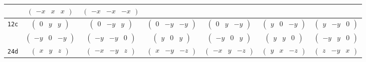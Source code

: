 \documentclass[fleqn,9pt,landscape]{jsarticle}
\begin{document}
\begin{center}
\begin{longtable}{ccccccc}
& $ \begin{pmatrix} - x & x & x \end{pmatrix} $ & $ \begin{pmatrix} - x & - x & - x \end{pmatrix} $ & $  $ & $  $ & $  $ & $  $ \\ \hline
{\tt 12c} & $ \begin{pmatrix} 0 & y & y \end{pmatrix} $ & $ \begin{pmatrix} 0 & - y & y \end{pmatrix} $ & $ \begin{pmatrix} 0 & - y & - y \end{pmatrix} $ & $ \begin{pmatrix} 0 & y & - y \end{pmatrix} $ & $ \begin{pmatrix} y & 0 & - y \end{pmatrix} $ & $ \begin{pmatrix} y & - y & 0 \end{pmatrix} $ \\
& $ \begin{pmatrix} - y & 0 & - y \end{pmatrix} $ & $ \begin{pmatrix} - y & - y & 0 \end{pmatrix} $ & $ \begin{pmatrix} y & 0 & y \end{pmatrix} $ & $ \begin{pmatrix} - y & 0 & y \end{pmatrix} $ & $ \begin{pmatrix} y & y & 0 \end{pmatrix} $ & $ \begin{pmatrix} - y & y & 0 \end{pmatrix} $ \\ \hline
{\tt 24d} & $ \begin{pmatrix} x & y & z \end{pmatrix} $ & $ \begin{pmatrix} - x & - y & z \end{pmatrix} $ & $ \begin{pmatrix} x & - y & - z \end{pmatrix} $ & $ \begin{pmatrix} - x & y & - z \end{pmatrix} $ & $ \begin{pmatrix} y & x & - z \end{pmatrix} $ & $ \begin{pmatrix} z & - y & x \end{pmatrix} $ \\

\end{longtable}
\end{center}
\end{document}
